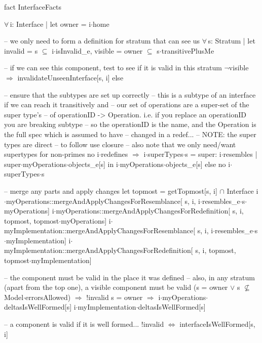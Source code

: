 fact InterfaceFacts
{
  $\forall\,$i: Interface |
  let
    owner = i$\cdot$home
  {
    -- we only need to form a definition for stratum that can see us
    $\forall\,$s: Stratum |
    let
      invalid = s $\subseteq$ i$\cdot$isInvalid_e,
      visible = owner $\subseteq$ s$\cdot$transitivePlusMe
    {
      -- if we can see this component, test to see if it is valid in this stratum
      $\neg$visible $\Longrightarrow$
        invalidateUnseenInterface[s, i]
      else
      {
        -- ensure that the subtypes are set up correctly
        -- this is a subtype of an interface if we can reach it transitively and
        -- our set of operations are a super-set of the super type's
        -- of operationID -> Operation.  i.e. if you replace an operationID you are breaking subtype
        -- so the operationID is the name, and the Operation is the full spec which is assumed to have
        -- changed in a redef...
        -- NOTE: the super types are direct -- to follow use closure
        --       also note that we only need/want supertypes for non-primes
        no i$\cdot$redefines $\Longrightarrow$
        {
          i$\cdot$superTypes$\cdot$s =
            { super: i$\cdot$resembles |
              super$\cdot$myOperations$\cdot$objects_e[s] in
                i$\cdot$myOperations$\cdot$objects_e[s] }
        }
        else
          no i$\cdot$superTypes$\cdot$s
      
        -- merge any parts and apply changes
        let topmost = getTopmost[s, i] $\cap$ Interface
        {
          i$\cdot$myOperations::mergeAndApplyChangesForResemblance[
            s, i, i$\cdot$resembles_e$\cdot$s$\cdot$myOperations]
          i$\cdot$myOperations::mergeAndApplyChangesForRedefinition[
            s, i, topmost, topmost$\cdot$myOperations]
          i$\cdot$myImplementation::mergeAndApplyChangesForResemblance[
            s, i, i$\cdot$resembles_e$\cdot$s$\cdot$myImplementation]
          i$\cdot$myImplementation::mergeAndApplyChangesForRedefinition[
            s, i, topmost, topmost$\cdot$myImplementation]
        }

        -- the component must be valid in the place it was defined
        -- also, in any stratum (apart from the top one), a visible component must be valid
        (s = owner $\vee$ s $\not\subseteq$ Model$\cdot$errorsAllowed) $\Longrightarrow$ !invalid
        s = owner $\Longrightarrow$
        {
          i$\cdot$myOperations$\cdot$deltasIsWellFormed[s]
          i$\cdot$myImplementation$\cdot$deltasIsWellFormed[s]
        }
        
        -- a component is valid if it is well formed...
        !invalid $\Longleftrightarrow$ interfaceIsWellFormed[s, i]
      }
    }
  }
}


